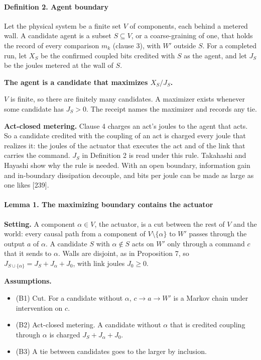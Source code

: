 \documentclass[
  10pt,
]{article}
\providecommand{\tightlist}{%
  \setlength{\itemsep}{0pt}\setlength{\parskip}{0pt}}
\begin{document}
\paragraph{Definition 2. Agent
boundary}\label{definition-2.-agent-boundary}

Let the physical system be a finite set \(V\) of components, each behind
a metered wall. A candidate agent is a subset \(S \subseteq V\), or a
coarse-graining of one, that holds the record of every comparison
\(m_k\) (clause 3), with \(W'\) outside \(S\). For a completed run, let
\(X_S\) be the confirmed coupled bits credited with \(S\) as the agent,
and let \(J_S\) be the joules metered at the wall of \(S\).

\textbf{The agent is a candidate that maximizes \(X_S / J_S\).}

\(V\) is finite, so there are finitely many candidates. A maximizer
exists whenever some candidate has \(J_S > 0\). The receipt names the
maximizer and records any tie.

\textbf{Act-closed metering.} Clause 4 charges an act's joules to the
agent that acts. So a candidate credited with the coupling of an act is
charged every joule that realizes it: the joules of the actuator that
executes the act and of the link that carries the command. \(J_S\) in
Definition 2 is read under this rule. Takahashi and Hayashi show why the
rule is needed. With an open boundary, information gain and in-boundary
dissipation decouple, and bits per joule can be made as large as one
likes {[}239{]}.

\paragraph{Lemma 1. The maximizing boundary contains the
actuator}\label{lemma-1.-the-maximizing-boundary-contains-the-actuator}

\textbf{Setting.} A component \(\alpha \in V\), the actuator, is a cut
between the rest of \(V\) and the world: every causal path from a
component of \(V \setminus \{\alpha\}\) to \(W'\) passes through the
output \(a\) of \(\alpha\). A candidate \(S\) with \(\alpha \notin S\)
acts on \(W'\) only through a command \(c\) that it sends to \(\alpha\).
Walls are disjoint, as in Proposition 7, so
\(J_{S \cup \{\alpha\}} = J_S + J_\alpha + J_0\), with link joules
\(J_0 \ge 0\).

\textbf{Assumptions.}

\begin{itemize}
\tightlist
\item
  (B1) Cut. For a candidate without \(\alpha\), \(c \to a \to W'\) is a
  Markov chain under intervention on \(c\).
\item
  (B2) Act-closed metering. A candidate without \(\alpha\) that is
  credited coupling through \(\alpha\) is charged
  \(J_S + J_\alpha + J_0\).
\item
  (B3) A tie between candidates goes to the larger by inclusion.
\end{itemize}
\end{document}
